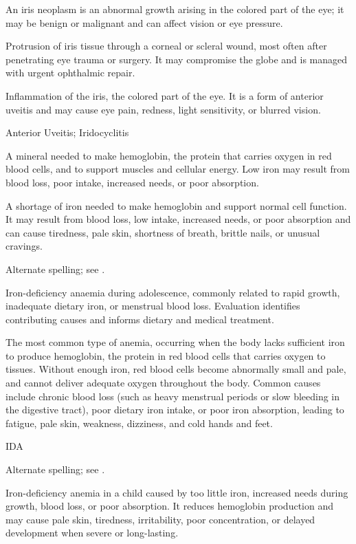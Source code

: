  An iris neoplasm is an abnormal growth arising in the colored part of the eye; it may be benign or malignant and can affect vision or eye pressure.

 Protrusion of iris tissue through a corneal or scleral wound, most often after penetrating eye trauma or surgery. It may compromise the globe and is managed with urgent ophthalmic repair.

 Inflammation of the iris, the colored part of the eye. It is a form of anterior uveitis and may cause eye pain, redness, light sensitivity, or blurred vision.

\synonyms
Anterior Uveitis; Iridocyclitis

 A mineral needed to make hemoglobin, the protein that carries oxygen in red blood cells, and to support muscles and cellular energy. Low iron may result from blood loss, poor intake, increased needs, or poor absorption.

 A shortage of iron needed to make hemoglobin and support normal cell function. It may result from blood loss, low intake, increased needs, or poor absorption and can cause tiredness, pale skin, shortness of breath, brittle nails, or unusual cravings.

 Alternate spelling; see .

 Iron-deficiency anaemia during adolescence, commonly related to rapid growth, inadequate dietary iron, or menstrual blood loss. Evaluation identifies contributing causes and informs dietary and medical treatment.

 The most common type of anemia, occurring when the body lacks sufficient iron to produce hemoglobin, the protein in red blood cells that carries oxygen to tissues. Without enough iron, red blood cells become abnormally small and pale, and cannot deliver adequate oxygen throughout the body. Common causes include chronic blood loss (such as heavy menstrual periods or slow bleeding in the digestive tract), poor dietary iron intake, or poor iron absorption, leading to fatigue, pale skin, weakness, dizziness, and cold hands and feet.

\synonyms
IDA

 Alternate spelling; see .

 Iron-deficiency anemia in a child caused by too little iron, increased needs during growth, blood loss, or poor absorption. It reduces hemoglobin production and may cause pale skin, tiredness, irritability, poor concentration, or delayed development when severe or long-lasting.

